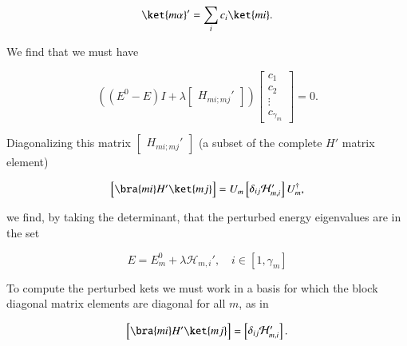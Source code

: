 \begin{equation}\label{eqn:qmTwoReview:750}
\ket{m \alpha}' = \sum_i c_i \ket{m i}.
\end{equation}

We find that we must have

\begin{equation}\label{eqn:qmTwoReview:770}
\left( (E^0 - E)I + \lambda \begin{bmatrix} H_{mi;mj}' \end{bmatrix} \right)
\begin{bmatrix}
c_1 \\
c_2 \\
\vdots \\
c_{\gamma_m}
\end{bmatrix}
= 0.
\end{equation}

Diagonalizing this matrix $\begin{bmatrix} H_{mi;mj}' \end{bmatrix}$ (a subset of the complete $H'$ matrix element)

\begin{equation}\label{eqn:qmTwoReview:790}
\begin{bmatrix}
\bra{m i} H' \ket{m j}
\end{bmatrix}
= U_m 
\begin{bmatrix}
\delta_{ij} 
\mathcal{H}_{m,i}'
\end{bmatrix}
 U_m^\dagger,
\end{equation}

we find, by taking the determinant, that the perturbed energy eigenvalues are in the set

\begin{equation}\label{eqn:qmTwoReview:810}
\boxed{
E = E_m^0 + \lambda \mathcal{H}_{m,i}', \quad i \in [1, \gamma_m]
}
\end{equation}

To compute the perturbed kets we must work in a basis for which the block diagonal matrix elements are diagonal for all $m$, as in

\begin{equation}\label{eqn:qmTwoReview:790b}
\begin{bmatrix}
\bra{m i} H' \ket{m j}
\end{bmatrix}
= 
\begin{bmatrix}
\delta_{ij} 
\mathcal{H}_{m,i}'
\end{bmatrix}.
\end{equation}

